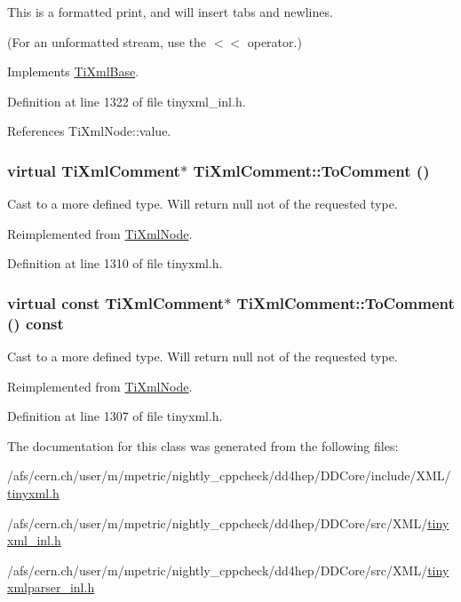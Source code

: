 This is a formatted print, and will insert tabs and newlines.

(For an unformatted stream, use the $<$$<$ operator.) 

Implements \hyperlink{class_ti_xml_base_a0de56b3f2ef14c65091a3b916437b512}{TiXmlBase}.

Definition at line 1322 of file tinyxml\_\-inl.h.

References TiXmlNode::value.\hypertarget{class_ti_xml_comment_acc7c7e07e13c23f17797d642981511df}{
\subsubsection[{ToComment}]{\setlength{\rightskip}{0pt plus 5cm}virtual {\bf TiXmlComment}$\ast$ TiXmlComment::ToComment ()}}
\label{class_ti_xml_comment_acc7c7e07e13c23f17797d642981511df}


Cast to a more defined type. Will return null not of the requested type. 

Reimplemented from \hyperlink{class_ti_xml_node_a383e06a0787f7063953934867990f849}{TiXmlNode}.

Definition at line 1310 of file tinyxml.h.\hypertarget{class_ti_xml_comment_a00fb4215c20a2399ea05ac9b9e7e68a0}{
\subsubsection[{ToComment}]{\setlength{\rightskip}{0pt plus 5cm}virtual const {\bf TiXmlComment}$\ast$ TiXmlComment::ToComment () const}}
\label{class_ti_xml_comment_a00fb4215c20a2399ea05ac9b9e7e68a0}


Cast to a more defined type. Will return null not of the requested type. 

Reimplemented from \hyperlink{class_ti_xml_node_aa0a5086f9eaee910bbfdc7f975e26574}{TiXmlNode}.

Definition at line 1307 of file tinyxml.h.

The documentation for this class was generated from the following files:\begin{DoxyCompactItemize}
\item 
/afs/cern.ch/user/m/mpetric/nightly\_\-cppcheck/dd4hep/DDCore/include/XML/\hyperlink{tinyxml_8h}{tinyxml.h}\item 
/afs/cern.ch/user/m/mpetric/nightly\_\-cppcheck/dd4hep/DDCore/src/XML/\hyperlink{tinyxml__inl_8h}{tinyxml\_\-inl.h}\item 
/afs/cern.ch/user/m/mpetric/nightly\_\-cppcheck/dd4hep/DDCore/src/XML/\hyperlink{tinyxmlparser__inl_8h}{tinyxmlparser\_\-inl.h}\end{DoxyCompactItemize}
